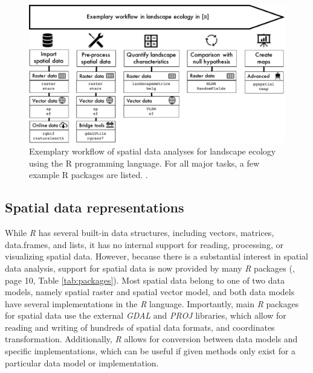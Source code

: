 \documentclass[smallextended]{svjour3}       %
\begin{document}
\begin{figure}
\includegraphics[width=1\linewidth,height=0.3\textheight]{data/Workflow} \caption{Exemplary workflow of spatial data analyses for landscape ecology using the R programming language. For all major tasks, a few example R packages are listed. .}\label{fig:fig-workflow}
\end{figure}

\hypertarget{sec:spatrep}{%
\subsection{Spatial data representations}\label{sec:spatrep}}

While \emph{R} has several built-in data structures, including vectors, matrices, data.frames, and lists, it has no internal support for reading, processing, or visualizing spatial data.
However, because there is a substantial interest in spatial data analysis, support for spatial data is now provided by many \emph{R} packages (\cite{Lovelace2019}, page 10, Table \ref{tab:packages}).
Most spatial data belong to one of two data models, namely spatial raster and spatial vector model, and both data models have several implementations in the \emph{R} language.
Importantly, main \emph{R} packages for spatial data use the external \emph{GDAL} \cite{GDAL} and \emph{PROJ} \cite{PROJ} libraries, which allow for reading and writing of hundreds of spatial data formats, and coordinates transformation.
Additionally, \emph{R} allows for conversion between data models and specific implementations, which can be useful if given methods only exist for a particular data model or implementation.
\end{document}
